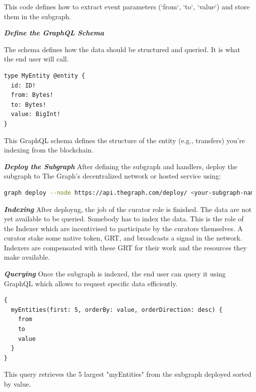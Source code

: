\documentclass[11pt,a4paper,titlepage]{scrartcl}
\begin{document}
This code defines how to extract event parameters (`from`, `to`, `value`) and store them in the subgraph.

\textbf{\textit{Define the GraphQL Schema}}

The schema defines how the data should be structured and queried. It is what the end user will call.


\begin{lstlisting}[language=xml, caption={Example GraphQL Schema}, label={lst:graphql_schema}, basicstyle=\ttfamily\scriptsize]
type MyEntity @entity {
  id: ID!
  from: Bytes!
  to: Bytes!
  value: BigInt!
}
\end{lstlisting}
 

This GraphQL schema defines the structure of the entity (e.g., transfers) you’re indexing from the blockchain.

\textbf{\textit{Deploy the Subgraph}}
After defining the subgraph and handlers, deploy the subgraph to The Graph’s decentralized network or hosted service using:

\begin{lstlisting}[language=bash, caption={Graph Deploy Command}, label={lst:graph_deploy}, basicstyle=\ttfamily\scriptsize]
graph deploy --node https://api.thegraph.com/deploy/ <your-subgraph-name>
\end{lstlisting}
 
\textbf{\textit{Indexing}}
After deployng, the job of the curator role is finished. The data are not yet available to be queried. Somebody has to index the data. This is the role of the Indexer which are incentivised to participate by the curators themselves. A curator stake some native token, GRT, and broadcasts a signal in the network. Indexers are compensated with these GRT for their work and the resources they make available.

\textbf{\textit{Querying}}
Once the subgraph is indexed, the end user can query it using GraphQL which allows to request specific data efficiently.

\begin{lstlisting}[language=xml, caption={Query for the Top 5 Token Transfers Sorted by Value}, label={lst:query_transfers}, basicstyle=\ttfamily\small]
{
  myEntities(first: 5, orderBy: value, orderDirection: desc) {
    from
    to
    value
  }
}
\end{lstlisting}


This query retrieves the 5 largest "myEntities" from the subgraph deployed  sorted by value.
\end{document}
